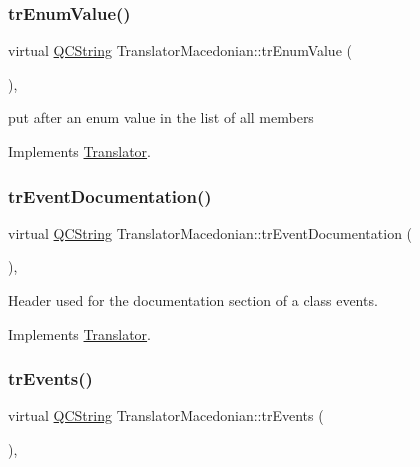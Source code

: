 \subsubsection{\texorpdfstring{trEnumValue()}{trEnumValue()}}
{\footnotesize\ttfamily virtual \mbox{\hyperlink{class_q_c_string}{Q\+C\+String}} Translator\+Macedonian\+::tr\+Enum\+Value (\begin{DoxyParamCaption}{ }\end{DoxyParamCaption})\hspace{0.3cm}{\ttfamily [inline]}, {\ttfamily [virtual]}}

put after an enum value in the list of all members 

Implements \mbox{\hyperlink{class_translator}{Translator}}.

\mbox{\label{class_translator_macedonian_a4733e20877c2cbb1f0d3cc928045bdcc}} 
\subsubsection{\texorpdfstring{trEventDocumentation()}{trEventDocumentation()}}
{\footnotesize\ttfamily virtual \mbox{\hyperlink{class_q_c_string}{Q\+C\+String}} Translator\+Macedonian\+::tr\+Event\+Documentation (\begin{DoxyParamCaption}{ }\end{DoxyParamCaption})\hspace{0.3cm}{\ttfamily [inline]}, {\ttfamily [virtual]}}

Header used for the documentation section of a class\textquotesingle{} events. 

Implements \mbox{\hyperlink{class_translator}{Translator}}.

\mbox{\label{class_translator_macedonian_a7c1a100ace034f892e692bf9d4f9958f}} 
\subsubsection{\texorpdfstring{trEvents()}{trEvents()}}
{\footnotesize\ttfamily virtual \mbox{\hyperlink{class_q_c_string}{Q\+C\+String}} Translator\+Macedonian\+::tr\+Events (\begin{DoxyParamCaption}{ }\end{DoxyParamCaption})\hspace{0.3cm}{\ttfamily [inline]}, {\ttfamily [virtual]}}

